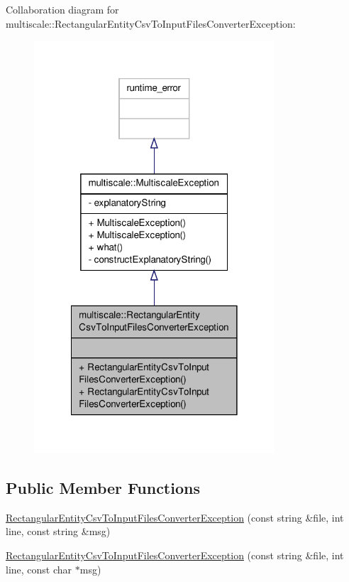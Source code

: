Collaboration diagram for multiscale\-:\-:Rectangular\-Entity\-Csv\-To\-Input\-Files\-Converter\-Exception\-:
\nopagebreak
\begin{figure}[H]
\begin{center}
\leavevmode
\includegraphics[width=254pt]{classmultiscale_1_1RectangularEntityCsvToInputFilesConverterException__coll__graph}
\end{center}
\end{figure}
\subsection*{Public Member Functions}
\begin{DoxyCompactItemize}
\item 
\hyperlink{classmultiscale_1_1RectangularEntityCsvToInputFilesConverterException_a03b6262f19a9816ea13a0ac02994af2b}{Rectangular\-Entity\-Csv\-To\-Input\-Files\-Converter\-Exception} (const string \&file, int line, const string \&msg)
\item 
\hyperlink{classmultiscale_1_1RectangularEntityCsvToInputFilesConverterException_ae62f1ace18cd2ab99c9633978b94b438}{Rectangular\-Entity\-Csv\-To\-Input\-Files\-Converter\-Exception} (const string \&file, int line, const char $\ast$msg)
\end{DoxyCompactItemize}


